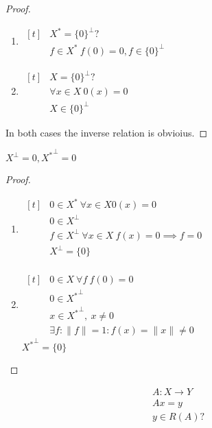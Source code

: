 \begin{proof}\leavevmode
  \begin{enumerate}
  \item
    $\begin{aligned}[t]
      &X^* = \{0\}^\perp ? \\
      &f \in X^*\ f(0) = 0, f \in \{0\}^\perp
    \end{aligned}$
  \item
    $\begin{aligned}[t]
      &X = \{0\}^\perp ?\\
      &\forall x \in X\ 0(x) = 0 \\
      &X \in \{0\}^\perp
    \end{aligned}$ 
  \end{enumerate}
  In both cases the inverse relation is obvioius.
\end{proof}

\begin{stm}
  $X^\perp = {0}, {X^*}^\perp = {0}$
\end{stm}

\begin{proof}\leavevmode
  \begin{enumerate}
  \item 
    $\begin{aligned}[t]
      &0 \in X^*\ \forall x \in X 0(x) = 0 \\
      &0 \in X^\perp \\
      &f \in X^\perp\ \forall x \in X\ f(x) = 0 \implies f = 0 \\
      &X^\perp = \{0\} \\
    \end{aligned}$
  \item
    $\begin{aligned}[t]
      &0 \in X\ \forall f\ f(0) = 0\\
      &0 \in {X^*}^\perp \\
      &x \in {X^*}^\perp,\ x \neq 0\\
      &\exists f: \|f\| = 1 : f(x) = \|x\| \neq 0
    \end{aligned}$ \\
     ${X^*}^\perp = \{0\}$ \qedhere
  \end{enumerate}
\end{proof}

\noindent
\begin{gather*}
  A \colon X \to Y \\
  A x = y \\
  y \in R(A)?
\end{gather*}

